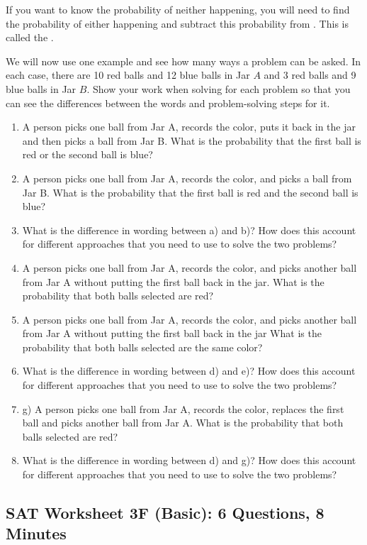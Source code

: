 \vfill
If you want to know the probability of neither happening, you will need to find the probability of either happening and subtract this probability from \shortline. This is called the \longline.

\vfill
\newpage
We will now use one example and see how many ways a problem can be asked. In each case, there are 10 red balls and 12 blue balls in Jar $A$ and 3 red balls and 9 blue balls in Jar $B$. Show your work when solving for each problem so that you can see the differences between the words and problem-solving steps for it. 

\begin{enumerate}[label=\alph*)]
\item A person picks one ball from Jar A, records the color, puts it back in the jar and then picks a ball from Jar B. What is the probability that the first ball is red or the second ball is blue?
\vfill\item A person picks one ball from Jar A, records the color, and picks a ball from Jar B. What is the probability that the first ball is red and the second ball is blue?
\vfill\item What is the difference in wording between a) and b)? How does this account for different approaches that you need to use to solve the two problems?
\vfill\item A person picks one ball from Jar A, records the color, and picks another ball from Jar A without putting the first ball back in the jar. What is the probability that both balls selected are red?
\vfill\item A person picks one ball from Jar A, records the color, and picks another ball from Jar A without putting the first ball back in the jar What is the probability that both balls selected are the same color?
\vfill\item What is the difference in wording between d) and e)? How does this account for different approaches that you need to use to solve the two problems?
\vfill\item g)	A person picks one ball from Jar A, records the color, replaces the first ball and picks another ball from Jar A. What is the probability that both balls selected are red?
\vfill\item What is the difference in wording between d) and g)? How does this account for different approaches that you need to use to solve the two problems?
\end{enumerate}

\vfill
\newpage
\subsection{SAT Worksheet 3F (Basic): 6 Questions, 8 Minutes}

